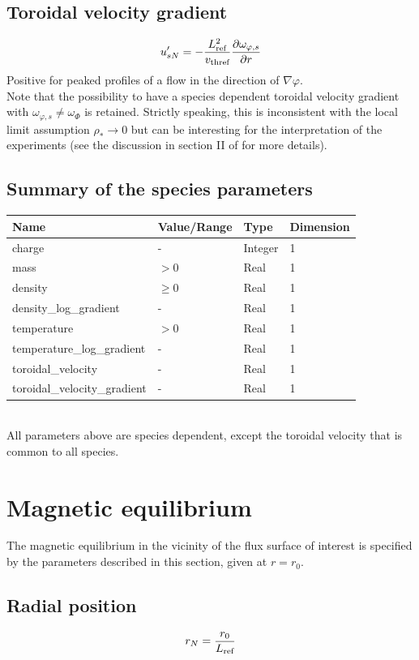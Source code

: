 \documentclass[fleqn]{report}
\begin{document}
\subsection{Toroidal velocity gradient}
$$u'_{sN}=-\frac{L_{\textrm{ref}}^2}{v_\textrm{thref}}\frac{\partial \omega_{\varphi,s}}{\partial r}$$
Positive for peaked profiles of a flow in the direction of $\nabla \varphi$.\\
Note that the possibility to have a species dependent toroidal velocity gradient with $\omega_{\varphi,s}\neq \omega_\Phi$ is retained. Strictly speaking, this is inconsistent with the local limit assumption $\rho_*\rightarrow 0$ but can be interesting for the interpretation of the experiments (see the discussion in section II of \cite{Camenen:PoP2016} for more details).


\subsection{Summary of the species parameters}
\begin{tabularx}{\textwidth}{|X|Y|Y|Y|}
\hline
Name & Value/Range & Type & Dimension \\
\hline
charge & - & Integer & 1 \\
mass & $>0$ & Real & 1 \\
density & $\geq0$ & Real & 1 \\
density\_log\_gradient & - & Real & 1 \\
temperature & $>0$ & Real & 1 \\
temperature\_log\_gradient & - & Real & 1 \\
toroidal\_velocity & - & Real & 1 \\
toroidal\_velocity\_gradient & - & Real & 1 \\
\hline
\end{tabularx}\\
All parameters above are species dependent, except the toroidal velocity that is common to all species. 

\section{Magnetic equilibrium}
The magnetic equilibrium in the vicinity of the flux surface of interest is specified by the parameters described in this section, given at $r=r_0$.

\subsection{Radial position}
$$r_N=\frac{r_0}{L_{\textrm{ref}}}$$
\end{document}
